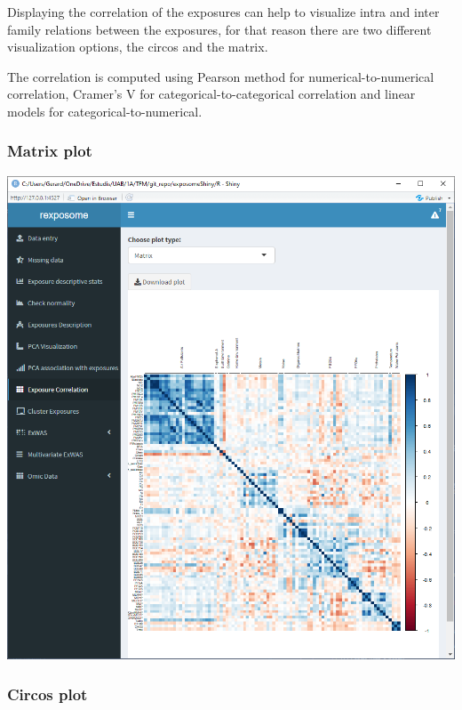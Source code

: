 \documentclass[
]{book}
\begin{document}
Displaying the correlation of the exposures can help to visualize intra and inter family relations between the exposures, for that reason there are two different visualization options, the circos and the matrix.

The correlation is computed using Pearson method for numerical-to-numerical correlation, Cramer's V for categorical-to-categorical correlation and linear models for categorical-to-numerical.

\hypertarget{matrix-plot}{%
\subsubsection{Matrix plot}\label{matrix-plot}}

\includegraphics{images/analysis6_2.png}

\hypertarget{circos-plot}{%
\subsubsection{Circos plot}\label{circos-plot}}
\end{document}
